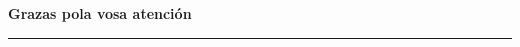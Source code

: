 
\begin{frame}
  \vfill
  \begin{center}
    {\color{ficblue}\Huge\bfseries Grazas pola vosa atención}\\[0.6em]
    {\color{udcpink}\rule{0.3\paperwidth}{0.5mm}}\\[0.8em]
    {\small\color{udcgray}\nome}
  \end{center}
  \vfill
\end{frame}
